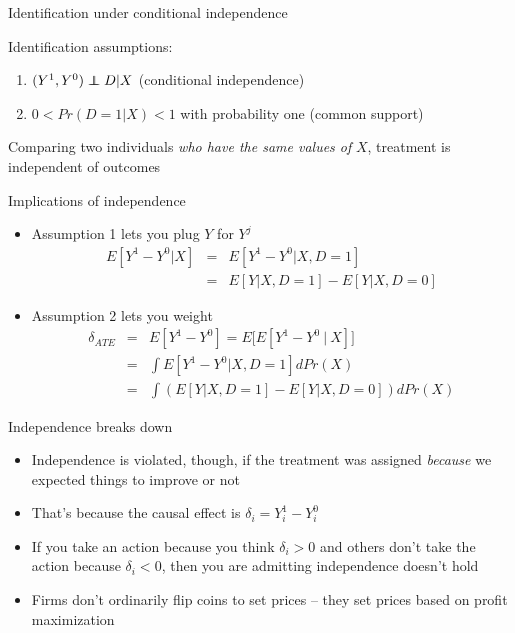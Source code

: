 \documentclass{beamer}
\newcommand\independent{\protect\mathpalette{\protect\independenT}{\perp}}
\def\independenT#1#2{\mathrel{\rlap{$#1#2$}\mkern2mu{#1#2}}}
\begin{document}
\begin{frame}{Identification under conditional independence}
	
Identification assumptions:
  \begin{enumerate}
		\item $(Y^1,Y^0) \independent{D} | X$ (conditional independence)
		\item $0<Pr(D=1|X)<1$ with probability one (common support)
  \end{enumerate}

\bigskip
Comparing two individuals \emph{who have the same values of} $X$, treatment is independent of outcomes
\end{frame}


\begin{frame}{Implications of independence}


	\begin{itemize}
	\item Assumption 1 lets you plug $Y$ for $Y^j$
		\begin{eqnarray*}
		E[Y^1-Y^0|X] &=& E[Y^1 - Y^0 | X,D=1] \\
		&=&E[Y|X,D=1] - E[Y|X,D=0]
		\end{eqnarray*}
	\item Assumption 2 lets you weight
		\begin{eqnarray*}
		\delta_{ATE} &=&E[Y^1-Y^0] = E\bigg[ E[Y^1 - Y^0 \ \vert \ X] \bigg] \\
		&=& \int E[Y^1 - Y^0 |X,D=1] dPr(X) \\
		&=& \int \left(E[Y|X,D=1] - E[Y|X,D=0]\right)dPr(X)
		\end{eqnarray*}
	\end{itemize}

\end{frame}

\begin{frame}{Independence breaks down}

\begin{itemize}
\item Independence is violated, though, if the treatment was assigned \emph{because} we expected things to improve or not
\item That's because the causal effect is $\delta_i = Y_i^1 - Y_i^0$
\item If you take an action because you think $\delta_i > 0$ and others don't take the action because $\delta_i < 0$, then you are admitting independence doesn't hold
\item Firms don't ordinarily flip coins to set prices -- they set prices based on profit maximization 
\end{itemize}

\end{frame}
\end{document}
